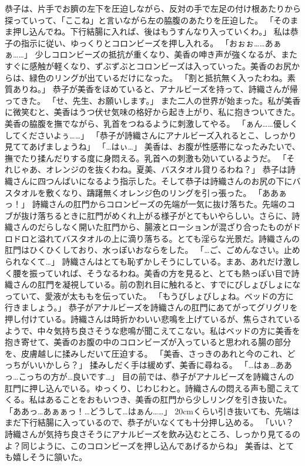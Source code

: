 恭子は、片手でお臍の左下を圧迫しながら、反対の手で左足の付け根あたりから探っていって、「ここね」と言いながら左の脇腹のあたりを圧迫した。
「そのまま押し込んでね。下行結腸に入れば、後はもうすんなり入っていくわ。」
私は恭子の指示に従い、ゆっくりとコロンビーズを押し入れる。
「おぉぉ……あぁぁ……」
少しコロンビーズの抵抗が重くなり、美香の呻き声が強くなるが、またすぐに感触が軽くなり、ずぶずぶとコロンビーズは入っていった。美香のお尻からは、緑色のリングが出ているだけになった。
「割と抵抗無く入ったわね。素質ありね。」
恭子が美香をほめていると、アナルビーズを持って、詩織さんが帰ってきた。
「せ、先生、お願いします。」
また二人の世界が始まった。私が美香に微笑むと、美香はうつ伏せ気味の格好から起き上がり、私に抱きついてきた。美香の脇腹を撫でながら、乳首をつねるように刺激してやる。
「ぁん……優しくしてくださいよぅ……」
「恭子が詩織さんにアナルビーズ入れるとこ、しっかり見ててあげましょうね」
「…はぃ…」
美香は、お腹が性感帯になったみたいで、撫でたり揉んだりする度に身悶える。乳首への刺激も効いているようだ。
「それじゃあ、オレンジのを抜くわね。夏美、バスタオル貸りるわね？」
恭子は詩織さんに四つんばいになるよう指示した。そして恭子は詩織さんのお尻の下にバスタオルを敷くなり、躊躇無くオレンジ色のリングを引っ張った。
「ああぁっ！」
詩織さんの肛門からコロンビーズの先端が一気に抜け落ちた。先端のコブが抜け落ちるときに肛門がめくれ上がる様子がとてもいやらしい。さらに、詩織さんのだらしなく開いた肛門から、腸液とローションが混ざり合ったものがドロドロと溢れてバスタオルの上に滴り落ちる。とても淫らな光景だ。詩織さんの肛門はひくひくしており、水っぽいおならをした。
「…ご、ごめんなさい。止められなくて…」
詩織さんはとても恥ずかしそうにしている。まあ、あれだけ激しく腰を振っていれば、そうなるわね。美香の方を見ると、とても熱っぽい目で詩織さんの肛門を凝視している。前の割れ目に触れると、すでにびしょびしょになっていて、愛液が太ももを伝っていた。
「もうびしょびしょね。ベッドの方に行きましょう。」
恭子がアナルビーズを詩織さんの肛門にあてがってグリグリを押し付けている。詩織さんは時折かわいい悲鳴を上げているが、焦らされているようで、中々気持ち良さそうな悲鳴が聞こえてこない。私はベッドの方に美香を抱き寄せて、美香のお腹の中のコロンビーズが入っていると思われる腸の部分を、皮膚越しに揉みしだいて圧迫する。
「美香、さっきのあれと今のこれ、どっちがいいかしら？」
揉みしだく手は緩めず、美香に尋ねる。
「…はぁ…ああっ…こっちの方が…良いです…」
目の前では、恭子がアナルビーズを詩織さんの肛門に押し込んでいる。ゆっくり、じわじわと。詩織さんの悶える声も聞こえてくる。私はあることをおもいつき、美香の肛門から少しリングを引き抜いた。
「ああっ…あぁぁっ！…どうして…はぁん……」
20cmくらい引き抜いても、先端はまだ下行結腸に入っているので、恭子がいなくても十分押し込める。
「いい？詩織さんが気持ち良さそうにアナルビーズを飲み込むところ、しっかり見てるのよ？同じように、このコロンビーズを押し込んであげるからね」
美香は、とても嬉しそうに頷いた。

